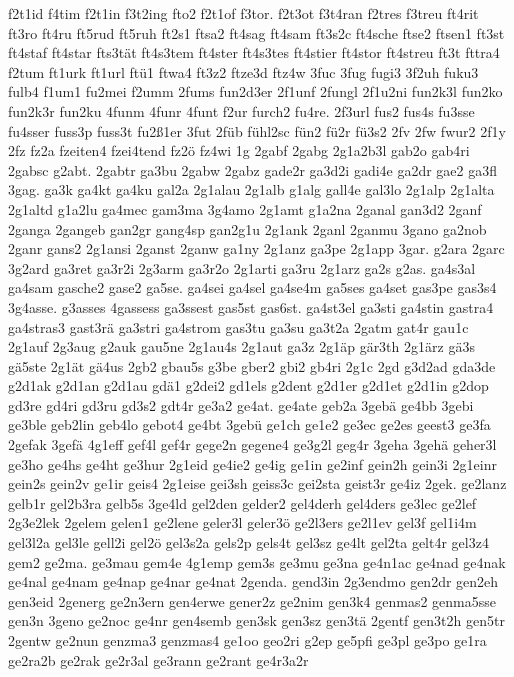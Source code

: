 {f2t1id
f4tim
f2t1in
f3t2ing
fto2
f2t1of
f3tor.
f2t3ot
f3t4ran
f2tres
f3treu
ft4rit
ft3ro
ft4ru
ft5rud
ft5ruh
ft2s1
ftsa2
ft4sag
ft4sam
ft3s2c
ft4sche
ftse2
ftsen1
ft3st
ft4staf
ft4star
fts3tät
ft4s3tem
ft4ster
ft4s3tes
ft4stier
ft4stor
ft4streu
ft3t
fttra4
f2tum
ft1urk
ft1url
ftü1
ftwa4
ft3z2
ftze3d
ftz4w
3fuc
3fug
fugi3
3f2uh
fuku3
fulb4
f1um1
fu2mei
f2umm
2fums
fun2d3er
2f1unf
2fungl
2f1u2ni
fun2k3l
fun2ko
fun2k3r
fun2ku
4funm
4funr
4funt
f2ur
furch2
fu4re.
2f3url
fus2
fus4s
fu3sse
fu4sser
fuss3p
fuss3t
fu2ß1er
3fut
2füb
fühl2sc
fün2
fü2r
fü3s2
2fv
2fw
fwur2
2f1y
2fz
fz2a
fzeiten4
fzei4tend
fz2ö
fz4wi
1g
2gabf
2gabg
2g1a2b3l
gab2o
gab4ri
2gabsc
g2abt.
2gabtr
ga3bu
2gabw
2gabz
gade2r
ga3d2i
gadi4e
ga2dr
gae2
ga3fl
3gag.
ga3k
ga4kt
ga4ku
gal2a
2g1alau
2g1alb
g1alg
gall4e
gal3lo
2g1alp
2g1alta
2g1altd
g1a2lu
ga4mec
gam3ma
3g4amo
2g1amt
g1a2na
2ganal
gan3d2
2ganf
2ganga
2gangeb
gan2gr
gang4sp
gan2g1u
2g1ank
2ganl
2ganmu
3gano
ga2nob
2ganr
gans2
2g1ansi
2ganst
2ganw
ga1ny
2g1anz
ga3pe
2g1app
3gar.
g2ara
2garc
3g2ard
ga3ret
ga3r2i
2g3arm
ga3r2o
2g1arti
ga3ru
2g1arz
ga2s
g2as.
ga4s3al
ga4sam
gasche2
gase2
ga5se.
ga4sei
ga4sel
ga4se4m
ga5ses
ga4set
gas3pe
gas3s4
3g4asse.
g3asses
4gassess
ga3ssest
gas5st
gas6st.
ga4st3el
ga3sti
ga4stin
gastra4
ga4stras3
gast3rä
ga3stri
ga4strom
gas3tu
ga3su
ga3t2a
2gatm
gat4r
gau1c
2g1auf
2g3aug
g2auk
gau5ne
2g1au4s
2g1aut
ga3z
2g1äp
gär3th
2g1ärz
gä3s
gä5ste
2g1ät
gä4us
2gb2
gbau5s
g3be
gber2
gbi2
gb4ri
2g1c
2gd
g3d2ad
gda3de
g2d1ak
g2d1an
g2d1au
gdä1
g2dei2
gd1els
g2dent
g2d1er
g2d1et
g2d1in
g2dop
gd3re
gd4ri
gd3ru
gd3s2
gdt4r
ge3a2
ge4at.
ge4ate
geb2a
3gebä
ge4bb
3gebi
ge3ble
geb2lin
geb4lo
gebot4
ge4bt
3gebü
ge1ch
ge1e2
ge3ec
ge2es
geest3
ge3fa
2gefak
3gefä
4g1eff
gef4l
gef4r
gege2n
gegene4
ge3g2l
geg4r
3geha
3gehä
geher3l
ge3ho
ge4hs
ge4ht
ge3hur
2g1eid
ge4ie2
ge4ig
ge1in
ge2inf
gein2h
gein3i
2g1einr
gein2s
gein2v
ge1ir
geis4
2g1eise
gei3sh
geiss3c
gei2sta
geist3r
ge4iz
2gek.
ge2lanz
gelb1r
gel2b3ra
gelb5s
3ge4ld
gel2den
gelder2
gel4derh
gel4ders
ge3lec
ge2lef
2g3e2lek
2gelem
gelen1
ge2lene
geler3l
geler3ö
ge2l3ers
ge2l1ev
gel3f
gel1i4m
gel3l2a
gel3le
gell2i
gel2ö
gel3s2a
gels2p
gels4t
gel3sz
ge4lt
gel2ta
gelt4r
gel3z4
gem2
ge2ma.
ge3mau
gem4e
4g1emp
gem3s
ge3mu
ge3na
ge4n1ac
ge4nad
ge4nak
ge4nal
ge4nam
ge4nap
ge4nar
ge4nat
2genda.
gend3in
2g3endmo
gen2dr
gen2eh
gen3eid
2generg
ge2n3ern
gen4erwe
gener2z
ge2nim
gen3k4
genmas2
genma5sse
gen3n
3geno
ge2noc
ge4nr
gen4semb
gen3sk
gen3sz
gen3tä
2gentf
gen3t2h
gen5tr
2gentw
ge2nun
genzma3
genzmas4
ge1oo
geo2ri
g2ep
ge5pfi
ge3pl
ge3po
ge1ra
ge2ra2b
ge2rak
ge2r3al
ge3rann
ge2rant
ge4r3a2r
}
